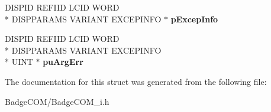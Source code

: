 \begin{DoxyCompactItemize}
\item 
\hypertarget{struct_i_badge_icon_synced_vtbl_a2f519620c5654619a040f23cf1c31d70}{D\-I\-S\-P\-I\-D R\-E\-F\-I\-I\-D L\-C\-I\-D W\-O\-R\-D \\*
D\-I\-S\-P\-P\-A\-R\-A\-M\-S V\-A\-R\-I\-A\-N\-T E\-X\-C\-E\-P\-I\-N\-F\-O $\ast$ {\bfseries p\-Excep\-Info}}\label{struct_i_badge_icon_synced_vtbl_a2f519620c5654619a040f23cf1c31d70}

\item 
\hypertarget{struct_i_badge_icon_synced_vtbl_a21fa7f8e14942c1f579e98889367fe62}{D\-I\-S\-P\-I\-D R\-E\-F\-I\-I\-D L\-C\-I\-D W\-O\-R\-D \\*
D\-I\-S\-P\-P\-A\-R\-A\-M\-S V\-A\-R\-I\-A\-N\-T E\-X\-C\-E\-P\-I\-N\-F\-O \\*
U\-I\-N\-T $\ast$ {\bfseries pu\-Arg\-Err}}\label{struct_i_badge_icon_synced_vtbl_a21fa7f8e14942c1f579e98889367fe62}

\end{DoxyCompactItemize}


The documentation for this struct was generated from the following file\-:\begin{DoxyCompactItemize}
\item 
Badge\-C\-O\-M/Badge\-C\-O\-M\-\_\-i.\-h\end{DoxyCompactItemize}
